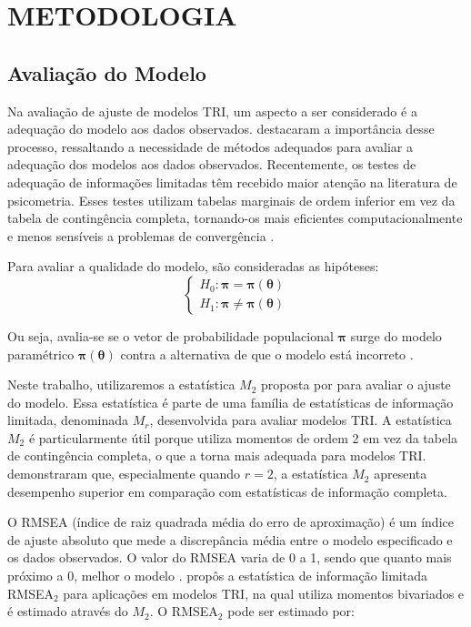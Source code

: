 \chapter{METODOLOGIA}

\section{Avaliação do Modelo}

Na avaliação de ajuste de modelos TRI, um aspecto a ser considerado é a adequação do modelo aos dados observados.  destacaram a importância desse processo, ressaltando a necessidade de métodos adequados para avaliar a adequação dos modelos aos dados observados. Recentemente, os testes de adequação de informações limitadas têm recebido maior atenção na literatura de psicometria. Esses testes utilizam tabelas marginais de ordem inferior em vez da tabela de contingência completa, tornando-os mais eficientes computacionalmente e menos sensíveis a problemas de convergência \cite{maydeu2014assessing}.

Para avaliar a qualidade do modelo, são consideradas as hipóteses:
\[
\begin{cases}
H_0: \boldsymbol{\pi} = \boldsymbol{\pi}(\boldsymbol{\theta}) \\

H_1: \boldsymbol{\pi} \neq \boldsymbol{\pi}(\boldsymbol{\theta})
\end{cases}
\]

Ou seja, avalia-se se o vetor de probabilidade populacional $\boldsymbol{\pi}$ surge do modelo paramétrico $\boldsymbol{\pi}(\boldsymbol{\theta})$ contra a alternativa de que o modelo está incorreto \cite{maydeu2006limited}.

Neste trabalho, utilizaremos a estatística $M_2$ proposta por  para avaliar o ajuste do modelo. Essa estatística é parte de uma família de estatísticas de informação limitada, denominada $M_r$, desenvolvida para avaliar modelos TRI. A estatística $M_2$ é particularmente útil porque utiliza momentos de ordem 2 em vez da tabela de contingência completa, o que a torna mais adequada para modelos TRI.  demonstraram que, especialmente quando $r=2$, a estatística $M_2$ apresenta desempenho superior em comparação com estatísticas de informação completa. 



O RMSEA (índice de raiz quadrada média do erro de aproximação) é um índice de ajuste absoluto que mede a discrepância média entre o modelo especificado e os dados observados. O valor do RMSEA varia de 0 a 1, sendo que quanto mais próximo a 0, melhor o modelo \cite{kline2016principles}.  propôs a estatística de informação limitada RMSEA$_{2}$ para aplicações em modelos TRI, na qual utiliza momentos bivariados e é estimado através do $M_2$. O RMSEA$_2$ pode ser estimado por:

